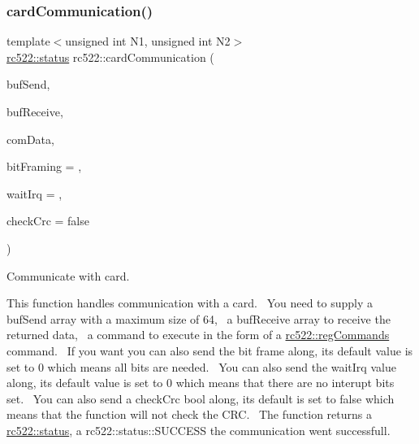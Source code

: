 \subsubsection{\texorpdfstring{card\+Communication()}{cardCommunication()}}
{\footnotesize\ttfamily template$<$unsigned int N1, unsigned int N2$>$ \\
\hyperlink{classspiReader_a4bcf984823c38cf4841ebf619e788790}{rc522\+::status} rc522\+::card\+Communication (\begin{DoxyParamCaption}\item[{std\+::array$<$ uint8\+\_\+t, N1 $>$ \&}]{buf\+Send,  }\item[{std\+::array$<$ uint8\+\_\+t, N2 $>$ \&}]{buf\+Receive,  }\item[{\hyperlink{classrc522_a3a205976fb9b7265bc5b7971215fbb7c}{rc522\+::reg\+Commands}}]{com\+Data,  }\item[{uint8\+\_\+t}]{bit\+Framing = {},  }\item[{uint8\+\_\+t}]{wait\+Irq = {},  }\item[{bool}]{check\+Crc = {\ttfamily false} }\end{DoxyParamCaption})\hspace{0.3cm}{\ttfamily [inline]}}



Communicate with card. 

This function handles communication with a card.~\newline
You need to supply a buf\+Send array with a maximum size of 64,~\newline
a buf\+Receive array to receive the returned data,~\newline
a command to execute in the form of a \hyperlink{classrc522_a3a205976fb9b7265bc5b7971215fbb7c}{rc522\+::reg\+Commands} command.~\newline
If you want you can also send the bit frame along, its default value is set to 0 which means all bits are needed.~\newline
You can also send the wait\+Irq value along, its default value is set to 0 which means that there are no interupt bits set.~\newline
You can also send a check\+Crc bool along, its default is set to false which means that the function will not check the C\+RC.~\newline
The function returns a \hyperlink{classspiReader_a4bcf984823c38cf4841ebf619e788790}{rc522\+::status}, a rc522\+::status\+::\+S\+U\+C\+C\+E\+SS the communication went successfull. \mbox{\label{classrc522_adcad63b7a87430ae943c833bcd9e24ab}} 
